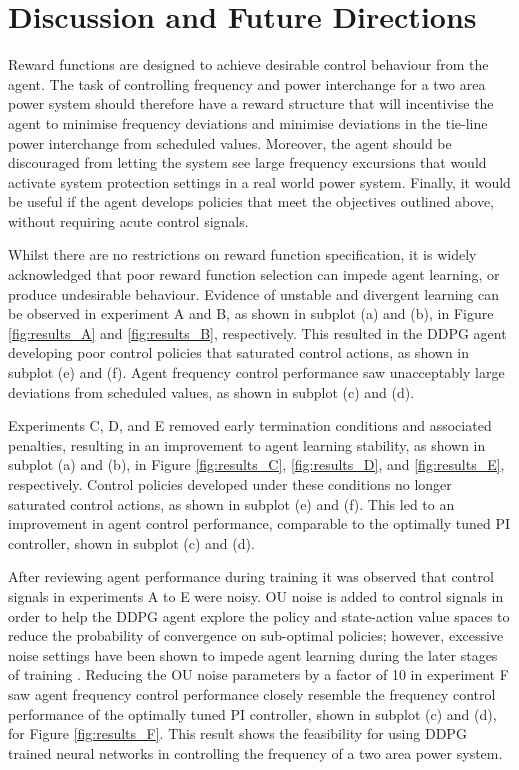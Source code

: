 \chapter{Discussion and Future Directions}

Reward functions are designed to achieve desirable control behaviour from the agent. The task of controlling frequency and power interchange for a two area power system should therefore have a reward structure that will incentivise the agent to minimise frequency deviations and minimise deviations in the tie-line power interchange from scheduled values. Moreover, the agent should be discouraged from letting the system see large frequency excursions that would activate system protection settings in a real world power system. Finally, it would be useful if the agent develops policies that meet the objectives outlined above, without requiring acute control signals.

Whilst there are no restrictions on reward function specification, it is widely acknowledged that poor reward function selection can impede agent learning, or produce undesirable behaviour. Evidence of unstable and divergent learning can be observed in experiment A and B, as shown in subplot (a) and (b), in Figure \ref{fig:results_A} and \ref{fig:results_B}, respectively. This resulted in the DDPG agent developing poor control policies that saturated control actions, as shown in subplot (e) and (f). Agent frequency control performance saw unacceptably large deviations from scheduled values, as shown in subplot (c) and (d).

Experiments C, D, and E removed early termination conditions and associated penalties, resulting in an improvement to agent learning stability, as shown in subplot (a) and (b), in Figure \ref{fig:results_C}, \ref{fig:results_D}, and \ref{fig:results_E}, respectively. Control policies developed under these conditions no longer saturated control actions, as shown in subplot (e) and (f). This led to an improvement in agent control performance, comparable to the optimally tuned PI controller, shown in subplot (c) and (d).

After reviewing agent performance during training it was observed that control signals in experiments A to E were noisy. OU noise is added to control signals in order to help the DDPG agent explore the policy and state-action value spaces to reduce the probability of convergence on sub-optimal policies; however, excessive noise settings have been shown to impede agent learning during the later stages of training \cite{}. Reducing the OU noise parameters by a factor of 10 in experiment F saw agent frequency control performance closely resemble the frequency control performance of the optimally tuned PI controller, shown in subplot (c) and (d), for Figure \ref{fig:results_F}. This result shows the feasibility for using DDPG trained neural networks in controlling the frequency of a two area power system.


